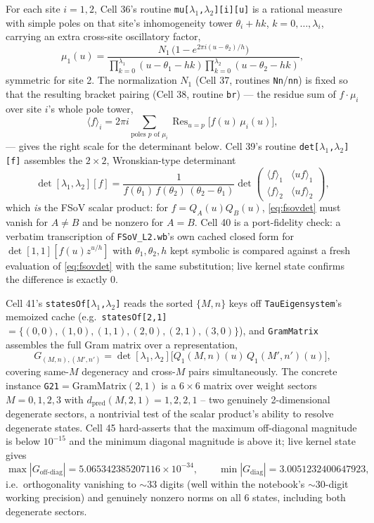\documentclass[11pt]{article}
\begin{document}
For each site $i=1,2$, Cell 36's routine \texttt{mu[$\lambda_1$,$\lambda_2$][i][u]} is a rational
measure with simple poles on that site's inhomogeneity tower $\theta_i+hk$,
$k=0,\dots,\lambda_i$, carrying an extra cross-site oscillatory factor,
\[
  \mu_1(u) = \frac{N_1\,\bigl(1-e^{2\pi i(u-\theta_2)/h}\bigr)}
                  {\prod_{k=0}^{\lambda_1}(u-\theta_1-hk)\prod_{k=0}^{\lambda_2}(u-\theta_2-hk)},
\]
symmetric for site 2. The normalization $N_1$ (Cell 37, routines \texttt{Nn}/\texttt{nn}) is fixed
so that the resulting bracket pairing (Cell 38, routine \texttt{br}) --- the residue sum of
$f\cdot\mu_i$ over site $i$'s whole pole tower,
\[
  \langle f\rangle_i = 2\pi i \sum_{\text{poles } p \text{ of } \mu_i}\operatorname{Res}_{u=p}\bigl[f(u)\,\mu_i(u)\bigr],
\]
--- gives the right scale for the determinant below. Cell 39's routine
\texttt{det[$\lambda_1$,$\lambda_2$][f]} assembles the $2\times2$, Wronskian-type determinant
\begin{equation}
  \det[\lambda_1,\lambda_2][f] = \frac{1}{f(\theta_1)\,f(\theta_2)\,(\theta_2-\theta_1)}
  \det\begin{pmatrix} \langle f\rangle_1 & \langle uf\rangle_1 \\ \langle f\rangle_2 & \langle uf\rangle_2 \end{pmatrix},
  \label{eq:fsovdet}
\end{equation}
which \emph{is} the FSoV scalar product: for $f=Q_A(u)Q_B(u)$, \eqref{eq:fsovdet} must vanish for
$A\neq B$ and be nonzero for $A=B$. Cell 40 is a port-fidelity check: a verbatim transcription of
\texttt{FSoV\_L2.wb}'s own cached closed form for $\det[1,1][f(u)z^{u/h}]$ with $\theta_1,\theta_2,h$
kept symbolic is compared against a fresh evaluation of \eqref{eq:fsovdet} with the same
substitution; live kernel state confirms the difference is exactly $0$.

Cell 41's \texttt{statesOf[$\lambda_1$,$\lambda_2$]} reads the sorted $\{M,n\}$ keys off
\texttt{TauEigensystem}'s memoized cache (e.g.\ \texttt{statesOf[2,1]} $=\{(0,0),(1,0),(1,1),(2,0),
(2,1),(3,0)\}$), and \texttt{GramMatrix} assembles the full Gram matrix over a representation,
\begin{equation}
  G_{(M,n),(M',n')} = \det[\lambda_1,\lambda_2]\bigl[Q_1(M,n)(u)\,Q_1(M',n')(u)\bigr],
  \label{eq:gram}
\end{equation}
covering same-$M$ degeneracy and cross-$M$ pairs simultaneously. The concrete instance
\texttt{G21}$=\mathrm{GramMatrix}(2,1)$ is a $6\times6$ matrix over weight sectors
$M=0,1,2,3$ with $d_{\mathrm{pred}}(M,2,1)=1,2,2,1$ -- two genuinely 2-dimensional degenerate
sectors, a nontrivial test of the scalar product's ability to resolve degenerate states. Cell 45
hard-asserts that the maximum off-diagonal magnitude is below $10^{-15}$ and the minimum diagonal
magnitude is above it; live kernel state gives
\[
  \max|G_{\text{off-diag}}| = 5.065342385207116\times10^{-34}, \qquad
  \min|G_{\text{diag}}| = 3.0051232400647923,
\]
i.e.\ orthogonality vanishing to $\sim33$ digits (well within the notebook's $\sim30$-digit working
precision) and genuinely nonzero norms on all 6 states, including both degenerate sectors.
\end{document}
